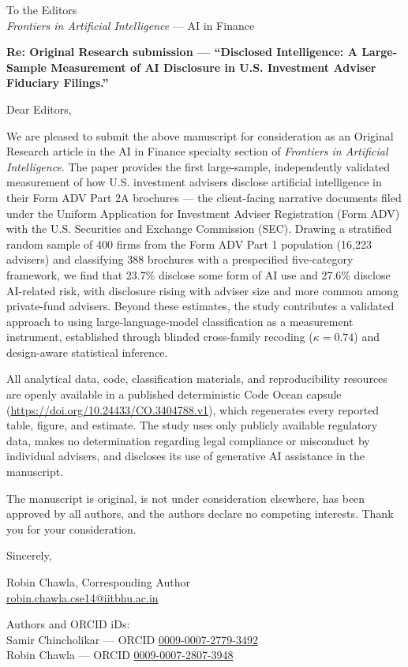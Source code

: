 \documentclass[11pt]{article}
\begin{document}
\noindent To the Editors\\
\emph{Frontiers in Artificial Intelligence} --- AI in Finance

\vspace{6pt}
\noindent\textbf{Re: Original Research submission --- ``Disclosed Intelligence: A Large-Sample Measurement of AI Disclosure in U.S. Investment Adviser Fiduciary Filings.''}

\vspace{6pt}
\noindent Dear Editors,

We are pleased to submit the above manuscript for consideration as an Original Research article in the AI in Finance specialty section of \emph{Frontiers in Artificial Intelligence}. The paper provides the first large-sample, independently validated measurement of how U.S. investment advisers disclose artificial intelligence in their Form ADV Part 2A brochures --- the client-facing narrative documents filed under the Uniform Application for Investment Adviser Registration (Form ADV) with the U.S. Securities and Exchange Commission (SEC). Drawing a stratified random sample of 400 firms from the Form ADV Part 1 population (16{,}223 advisers) and classifying 388 brochures with a prespecified five-category framework, we find that 23.7\% disclose some form of AI use and 27.6\% disclose AI-related risk, with disclosure rising with adviser size and more common among private-fund advisers. Beyond these estimates, the study contributes a validated approach to using large-language-model classification as a measurement instrument, established through blinded cross-family recoding ($\kappa = 0.74$) and design-aware statistical inference.

All analytical data, code, classification materials, and reproducibility resources are openly available in a published deterministic Code Ocean capsule (\url{https://doi.org/10.24433/CO.3404788.v1}), which regenerates every reported table, figure, and estimate. The study uses only publicly available regulatory data, makes no determination regarding legal compliance or misconduct by individual advisers, and discloses its use of generative AI assistance in the manuscript.

The manuscript is original, is not under consideration elsewhere, has been approved by all authors, and the authors declare no competing interests. Thank you for your consideration.

\vspace{12pt}
\noindent Sincerely,

\vspace{2pt}
\noindent Robin Chawla, Corresponding Author\\
\href{mailto:robin.chawla.cse14@iitbhu.ac.in}{robin.chawla.cse14@iitbhu.ac.in}

\vspace{6pt}
\noindent Authors and ORCID iDs:\\
Samir Chincholikar --- ORCID \href{https://orcid.org/0009-0007-2779-3492}{0009-0007-2779-3492}\\
Robin Chawla --- ORCID \href{https://orcid.org/0009-0007-2807-3948}{0009-0007-2807-3948}
\end{document}
